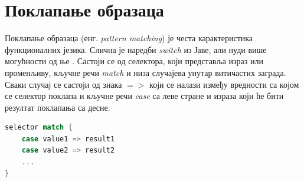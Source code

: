 \documentclass[12pt,oneside]{memoir}
\begin{document}

\section{Поклапање образаца}
\label{sec:scala_patt_match}

Поклапање образаца (енг. \textit{pattern matching}) је честа карактеристика функционалних језика. Слична је наредби \textit{switch} из Јаве, али нуди више могућности од ње \cite{scala_prog}. Састоји се од селектора, који представља израз или променљиву, кључне речи \textit{match} и низа случајева унутар витичастих заграда. Сваки случај се састоји од знака $=>$ који се налази између вредности са којом се селектор поклапа и кључне речи \textit{case} са леве стране и израза који ће бити резултат поклапања са десне.

\begin{lstlisting}[language=Scala, caption={Поклапање образаца у Скали}, label={lst:scala_coll_patt_match}]
selector match {
	case value1 => result1
	case value2 => result2
	...
}
\end{lstlisting}
\end{document}
